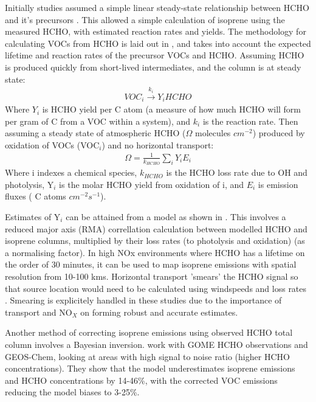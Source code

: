    Initially studies assumed a simple linear steady-state relationship between HCHO and it's precursors \citep{Palmer2003, Palmer2006, Millet2006}.
   This allowed a simple calculation of isoprene using the measured HCHO, with estimated reaction rates and yields.
   The methodology for calculating VOCs from HCHO is laid out in \citet{Palmer2003}, and takes into account the expected lifetime and reaction rates of the precursor VOCs and HCHO.
   Assuming HCHO is produced quickly from short-lived intermediates, and the column is at steady state:
   \begin{eqnarray*}
   VOC_i \overset{k_i}{\rightarrow} Y_i HCHO
   \end{eqnarray*}
   Where $Y_i$ is HCHO yield per C atom (a measure of how much HCHO will form per gram of C from a VOC within a system), and $k_i$ is the reaction rate.
   Then assuming a steady state of atmospheric HCHO ($\Omega$ molecules $cm^{-2}$) produced by oxidation of VOCs (VOC$_i$) and no horizontal transport:
   \begin{eqnarray*}
   \Omega = \frac{1}{k_{HCHO}} \sum_{i} Y_i E_i
   \end{eqnarray*}
   Where i indexes a chemical species, $k_{HCHO}$ is the HCHO loss rate due to OH and photolysis, Y$_i$ is the molar HCHO yield from oxidation of i, and $E_i$ is emission fluxes ( C atoms $cm^{-2}s^{-1}$).
   
   Estimates of Y$_i$ can be attained from a model as shown in \citet{Millet2006}.
   This involves a reduced major axis (RMA) correllation calculation between modelled HCHO and isoprene columns, multiplied by their loss rates (to photolysis and oxidation) (as a normalising factor).  
   In high NOx environments where HCHO has a lifetime on the order of 30 minutes, it can be used to map isoprene emissions with spatial resolution from 10-100 kms.
   Horizontal transport 'smears' the HCHO signal so that source location would need to be calculated using windspeeds and loss rates \citep{Palmer2001,Palmer2003}.
   Smearing is explicitely handled in these studies due to the importance of transport and NO$_X$ on forming robust and accurate estimates.
   
   Another method of correcting isoprene emissions using observed HCHO total column involves a Bayesian inversion.
   \citet{Shim2005} work with GOME HCHO observations and GEOS-Chem, looking at areas with high signal to noise ratio (higher HCHO concentrations).
   They show that the model underestimates isoprene emissions and HCHO concentrations by 14-46\%, with the corrected VOC emissions reducing the model biases to 3-25\%.
   
